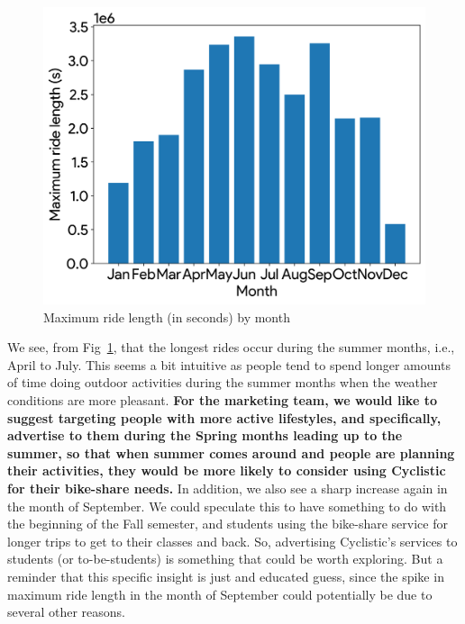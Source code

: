 \documentclass{article}
\begin{document}
\begin{figure}[h]
  \centering
  \includegraphics[width=\textwidth]{figs/ride_max_month}
  \caption{Maximum ride length (in seconds) by month}
  \label{fig:ride_max_month}
\end{figure}


We see, from Fig~\ref{fig:ride_max_month}, that the longest rides occur during the summer months, i.e., April to July. This seems a bit intuitive as people tend to spend longer amounts of time doing outdoor activities during the summer months when the weather conditions are more pleasant. \textbf{For the marketing team, we would like to suggest targeting people with more active lifestyles, and specifically, advertise to them during the Spring months leading up to the summer, so that when summer comes around and people are planning their activities, they would be more likely to consider using Cyclistic for their bike-share needs.} In addition, we also see a sharp increase again in the month of September. We could speculate this to have something to do with the beginning of the Fall semester, and students using the bike-share service for longer trips to get to their classes and back. So, advertising Cyclistic's services to students (or to-be-students) is something that could be worth exploring. But a reminder that this specific insight is just and educated guess, since the spike in maximum ride length in the month of September could potentially be due to several other reasons.
\end{document}

